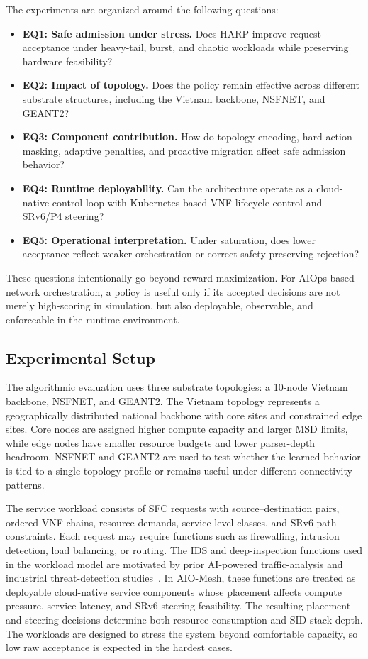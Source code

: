 \documentclass[final,5p]{elsarticle}
\begin{document}
The experiments are organized around the following questions:
\begin{itemize}
    \item \textbf{EQ1: Safe admission under stress.} Does HARP improve request acceptance under heavy-tail, burst, and chaotic workloads while preserving hardware feasibility?
    \item \textbf{EQ2: Impact of topology.} Does the policy remain effective across different substrate structures, including the Vietnam backbone, NSFNET, and GEANT2?
    \item \textbf{EQ3: Component contribution.} How do topology encoding, hard action masking, adaptive penalties, and proactive migration affect safe admission behavior?
    \item \textbf{EQ4: Runtime deployability.} Can the architecture operate as a cloud-native control loop with Kubernetes-based VNF lifecycle control and SRv6/P4 steering?
    \item \textbf{EQ5: Operational interpretation.} Under saturation, does lower acceptance reflect weaker orchestration or correct safety-preserving rejection?
\end{itemize}

These questions intentionally go beyond reward maximization. For AIOps-based network orchestration, a policy is useful only if its accepted decisions are not merely high-scoring in simulation, but also deployable, observable, and enforceable in the runtime environment.

\subsection{Experimental Setup}
\label{subsec:experimental_setup}

The algorithmic evaluation uses three substrate topologies: a 10-node Vietnam backbone, NSFNET, and GEANT2. The Vietnam topology represents a geographically distributed national backbone with core sites and constrained edge sites. Core nodes are assigned higher compute capacity and larger MSD limits, while edge nodes have smaller resource budgets and lower parser-depth headroom. NSFNET and GEANT2 are used to test whether the learned behavior is tied to a single topology profile or remains useful under different connectivity patterns.

The service workload consists of SFC requests with source--destination pairs, ordered VNF chains, resource demands, service-level classes, and SRv6 path constraints. Each request may require functions such as firewalling, intrusion detection, load balancing, or routing. The IDS and deep-inspection functions used in the workload model are motivated by prior AI-powered traffic-analysis and industrial threat-detection studies~\cite{jSAID23,jAPELID24,cCSFS25}. In AIO-Mesh, these functions are treated as deployable cloud-native service components whose placement affects compute pressure, service latency, and SRv6 steering feasibility. The resulting placement and steering decisions determine both resource consumption and SID-stack depth. The workloads are designed to stress the system beyond comfortable capacity, so low raw acceptance is expected in the hardest cases.
\end{document}
